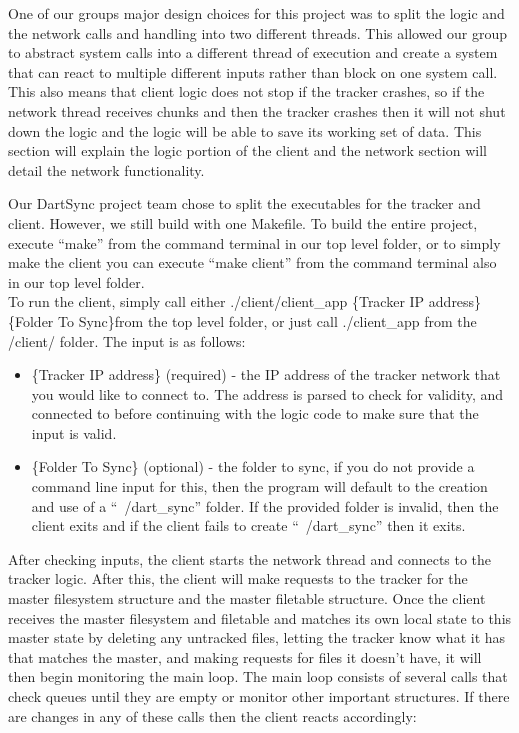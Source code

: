 	
	One of our groups major design choices for this project was to split the logic and the network calls and handling into two different threads.  This allowed our group to abstract system calls into a different thread of execution and create a system that can react to multiple different inputs rather than block on one system call.  This also means that client logic does not stop if the tracker crashes, so if the network thread receives chunks and then the tracker crashes then it will not shut down the logic and the logic will be able to save its working set of data.  This section will explain the logic portion of the client and the network section will detail the network functionality.


	Our DartSync project team chose to split the executables for the tracker and client.  However, we still build with one Makefile.  To build the entire project, execute ``make'' from the command terminal in our top level folder, or to simply make the client you can execute ``make client'' from the command terminal also in our top level folder.  \\

	To run the client, simply call either ./client/client_app \{Tracker IP address\} \{Folder To Sync\}from the top level folder, or just call ./client_app from the /client/ folder.  The input is as follows:
	
	\begin{itemize}
		\item \{Tracker IP address\} (required) - the IP address of the tracker network that you would like to connect to.  The address is parsed to check for validity, and connected to before continuing with the logic code to make sure that the input is valid.
		\item \{Folder To Sync\} (optional) - the folder to sync, if you do not provide a command line input for this, then the program will default to the creation and use of a ``~/dart_sync'' folder.  If the provided folder is invalid, then the client exits and if the client fails to create ``~/dart_sync'' then it exits.
	\end{itemize}


	After checking inputs, the client starts the network thread and connects to the tracker logic. After this, the client will make requests to the tracker for the master filesystem structure and the master filetable structure. Once the client receives the master filesystem and filetable and matches its own local state to this master state by deleting any untracked files, letting the tracker know what it has that matches the master, and making requests for files it doesn't have, it will then begin monitoring the main loop.  The main loop consists of several calls that check queues until they are empty or monitor other important structures.  If there are changes in any of these calls then the client reacts accordingly:

